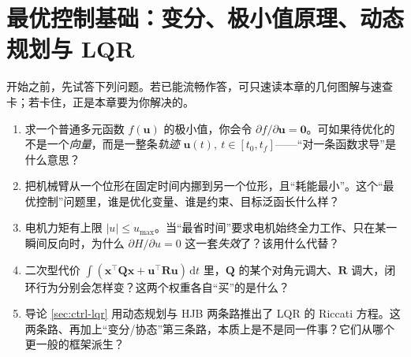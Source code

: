\chapter{最优控制基础：变分、极小值原理、动态规划与 LQR}
\label{ch:optimal-control-basics}


\begin{practice}[前置自测]
开始之前，先试答下列问题。若已能流畅作答，可只速读本章的几何图解与速查卡；若卡住，正是本章要为你解决的。
\begin{enumerate}
  \item 求一个普通多元函数 $f(\mathbf{u})$ 的极小值，你会令 $\partial f/\partial\mathbf{u}=\mathbf{0}$。可如果待优化的不是一个\emph{向量}，而是一整条\emph{轨迹} $\mathbf{u}(t),\ t\in[t_0,t_f]$——“对一条函数求导”是什么意思？
  \item 把机械臂从一个位形在固定时间内挪到另一个位形，且“耗能最小”。这个“最优控制”问题里，谁是优化变量、谁是约束、目标泛函长什么样？
  \item 电机力矩有上限 $|u|\le u_{\max}$。当“最省时间”要求电机始终全力工作、只在某一瞬间反向时，为什么 $\partial H/\partial u=0$ 这一套\emph{失效}了？该用什么代替？
  \item 二次型代价 $\int(\mathbf{x}^\top\mathbf{Q}\mathbf{x}+\mathbf{u}^\top\mathbf{R}\mathbf{u})\,\mathrm dt$ 里，$\mathbf{Q}$ 的某个对角元调大、$\mathbf{R}$ 调大，闭环行为分别会怎样变？这两个权重各自“买”的是什么？
  \item 导论 \cref{sec:ctrl-lqr} 用动态规划与 HJB 两条路推出了 LQR 的 Riccati 方程。这两条路、再加上“变分/协态”第三条路，本质上是不是同一件事？它们从哪个更一般的框架派生？
\end{enumerate}
\end{practice}

